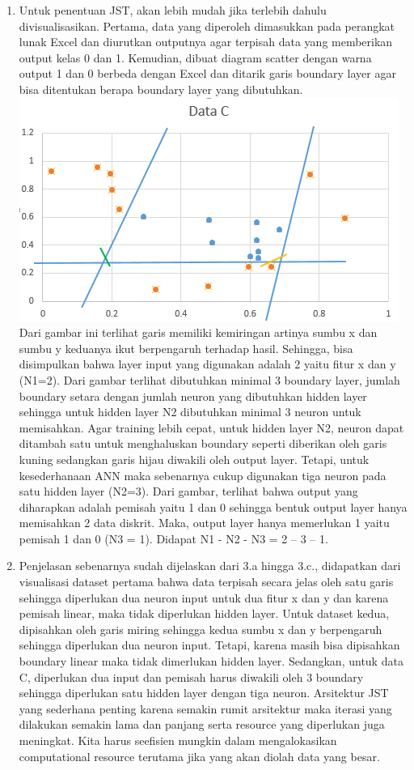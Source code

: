 \documentclass[12pt]{article}
\begin{document}
\begin{enumerate}[label=(\alph*)]
	\item %
	Untuk penentuan JST, akan lebih mudah jika terlebih dahulu divisualisasikan. Pertama, data yang diperoleh dimasukkan pada perangkat lunak Excel dan diurutkan outputnya agar terpisah data yang memberikan output kelas 0 dan 1. Kemudian, dibuat diagram scatter dengan warna output 1 dan 0 berbeda dengan Excel dan ditarik garis boundary layer agar bisa ditentukan berapa boundary layer yang dibutuhkan. \\
	\includegraphics[scale=1]{UASFiskom0305.png}\\
	Dari gambar ini terlihat garis memiliki kemiringan artinya sumbu x dan sumbu y keduanya ikut berpengaruh terhadap hasil. Sehingga, bisa disimpulkan bahwa layer input yang digunakan adalah 2 yaitu fitur x dan y (N1=2).
	Dari gambar terlihat dibutuhkan minimal 3 boundary layer, jumlah boundary setara dengan jumlah neuron yang dibutuhkan hidden layer sehingga untuk hidden layer N2 dibutuhkan minimal 3 neuron untuk memisahkan. Agar training lebih cepat, untuk hidden layer N2, neuron dapat ditambah satu untuk menghaluskan boundary seperti diberikan oleh garis kuning sedangkan garis hijau diwakili oleh output layer. Tetapi, untuk kesederhanaan ANN maka sebenarnya cukup digunakan tiga neuron pada satu hidden layer (N2=3).
	Dari gambar, terlihat bahwa output yang diharapkan adalah pemisah yaitu 1 dan 0 sehingga bentuk output layer hanya memisahkan 2 data diskrit. Maka, output layer hanya memerlukan 1 yaitu pemisah 1 dan 0 (N3 = 1).
	Didapat N1 - N2 - N3 = 2 – 3 – 1.
	\item %
	Penjelasan sebenarnya sudah dijelaskan dari 3.a hingga 3.c., didapatkan dari visualisasi dataset pertama bahwa data terpisah secara jelas oleh satu garis sehingga diperlukan dua neuron input untuk dua fitur x dan y dan karena pemisah linear, maka tidak diperlukan hidden layer. Untuk dataset kedua, dipisahkan oleh garis miring sehingga kedua sumbu x dan y berpengaruh sehingga diperlukan dua neuron input. Tetapi, karena masih bisa dipisahkan boundary linear maka tidak dimerlukan hidden layer. Sedangkan, untuk data C, diperlukan dua input dan pemisah harus diwakili oleh 3 boundary sehingga diperlukan satu hidden layer dengan tiga neuron.
	Arsitektur JST yang sederhana penting karena semakin rumit arsitektur maka iterasi yang dilakukan semakin lama dan panjang serta resource yang diperlukan juga meningkat. Kita harus seefisien mungkin dalam mengalokasikan computational resource terutama jika yang akan diolah data yang besar.
	
\end{enumerate}
\end{document}
